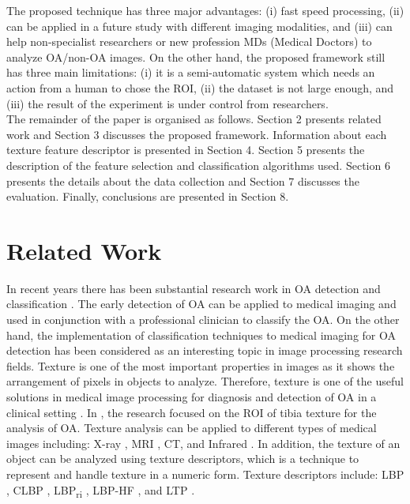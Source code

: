 \documentclass[review]{elsarticle}
\begin{document}
The proposed technique has three major advantages: (i) fast speed processing, (ii) can be applied in a future study with different imaging modalities, and (iii) can help non-specialist researchers or new profession MDs (Medical Doctors) to analyze OA/non-OA images. On the other hand, the proposed framework still has three main limitations: (i) it is a semi-automatic system which needs an action from a human to chose the ROI, (ii) the dataset is not large enough, and (iii) the result of the experiment is under control from researchers.\\

The remainder of the paper is organised as follows. Section 2 presents related work and Section 3 discusses the proposed framework. Information about each texture feature descriptor is presented in Section 4. Section 5 presents the description of the feature selection and classification algorithms used. Section 6 presents the details about the data collection and Section 7 discusses the evaluation. Finally, conclusions are presented in Section 8. 

\section{Related Work}

In recent years there has been substantial research work in OA detection and classification \cite{Wolski2010, Jin2013, Shamir2009, S.2016, Kotti2017}. The early detection of OA can be applied to medical imaging and used in conjunction with a professional clinician to classify the OA. On the other hand, the implementation of classification techniques to medical imaging for OA detection has been considered as an interesting topic in image processing research fields. Texture is one of the most important properties in images as it shows the arrangement of pixels in objects to analyze. Therefore, texture is one of the useful solutions in medical image processing for diagnosis and detection of OA in a clinical setting \cite{Castellano2004, Janvier2015}. In \cite{Wolski2010}, the research focused on the ROI of tibia texture for the analysis of OA. Texture analysis can be applied to different types of medical images including: X-ray \cite{Wolski2010}, MRI \cite{Chuah2011}, CT, and Infrared \cite{Jin2013}. In addition, the texture of an object can be analyzed using texture descriptors, which is a technique to represent and handle texture in a numeric form. Texture descriptors include: LBP \cite{Castellano2004, Dittakan2016, Kachouie2007}, CLBP \cite{Guo2010}, LBP\textsubscript{ri} \cite{Varney2015}, LBP-HF \cite{Prasad2016}, and LTP \cite{Tan2010, Wang2014}. \\
\end{document}
